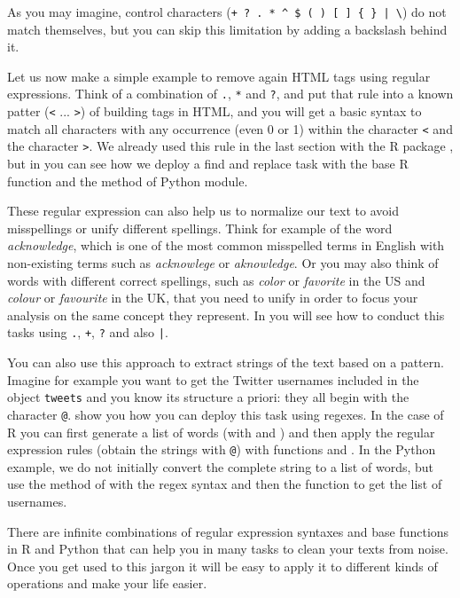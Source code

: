 As you may imagine, control characters (\verb!+ ? . * ^ $ ( ) [ ] { } | \!) do not match themselves, but you can skip this limitation by adding a backslash behind it.

Let us now make a simple example to remove again HTML tags using regular expressions. Think of a combination of \verb+.+, \verb+*+ and \verb+?+, and put that rule into a known patter (\verb+<+ ... \verb+>+) of building tags in HTML, and you will get a basic syntax to match all characters with any occurrence (even 0 or 1) within the character \verb+<+ and the character \verb+>+. We already used this rule in the last section with the R package , but in  you can see how we deploy a find and replace task with the base R function  and the method  of Python  module.		


These regular expression can also help us to normalize our text to avoid misspellings or unify different spellings. Think for example of the word \emph{acknowledge}, which is one of the most common misspelled terms in English with non-existing terms such as \emph{acknowlege} or \emph{aknowledge}. Or you may also think of words with different correct spellings, such as \emph{color} or \emph{favorite} in the US and \emph{colour} or \emph{favourite} in the UK, that you need to unify in order to focus your analysis on the same concept they represent. In  you will see how to conduct this tasks using \verb+.+, \verb|+|, \verb+?+ and also \verb+|+.


You can also use this approach to extract strings of the text based on a pattern. Imagine for example you want to get the Twitter usernames included in the object \texttt{tweets} and you know its structure a priori: they all begin with the character \texttt{@}.  show you how you can deploy this task using regexes. In the case of R you can first generate a list of words (with  and ) and then apply the regular expression rules (obtain the strings with \texttt{@}) with functions  and . In the Python example, we do not initially convert the complete string to a list of words, but use the  method of  with the regex syntax and then the function  to get the list of usernames.


There are infinite combinations of regular expression syntaxes and base functions in R and Python that can help you in many tasks to clean your texts from noise. Once you get used to this jargon it will be easy to apply it to different kinds of operations and make your life easier.